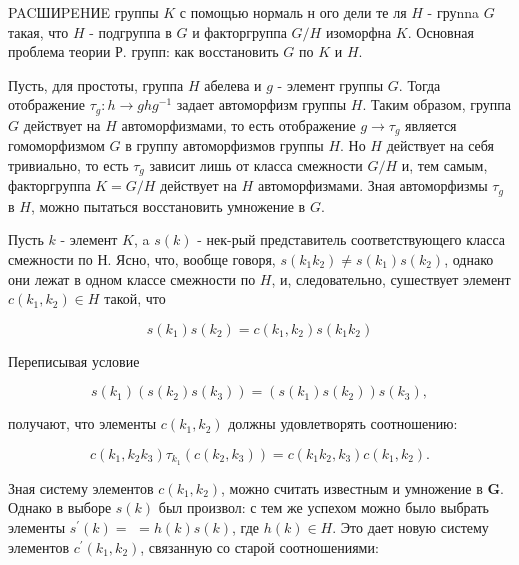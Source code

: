 \documentclass[10pt]{article}
\begin{document}
PACШИPEHИE группы $K$ с помощью нормаль н ого дели те ля $H$ - груnna $G$ такая, что $H$ - подгруппа в $G$ и факторгруппа $G / H$ изоморфна $K$. Основная проблема теории Р. групп: как восстановить $G$ по $K$ и $H$.



Пусть, для простоты, группа $H$ абелева и $g$ - элемент группы $G$. Тогда отображение $\tau_{g}: h \rightarrow g h g^{-1}$ задает автоморфизм группы $H$. Таким образом, группа $G$ действует на $H$ автоморфизмами, то есть отображение $g \rightarrow \tau_{g}$ является гомоморфизмом $G$ в группу автоморфизмов группы $H$. Но $H$ действует на себя тривиально, то есть $\tau_{g}$ зависит лишь от класса смежности $G / H$ и, тем самым, факторгруппа $K=G / H$ действует на $H$ автоморфизмами. Зная автоморфизмы $\tau_{g}$ в $H$, можно пытаться восстановить умножение в $G$.



Пусть $k$ - элемент $K$, a $s(k)$ - нек-рый представитель соответствующего класса смежности по Н. Ясно, что, вообще говоря, $s\left(k_{1} k_{2}\right) \neq s\left(k_{1}\right) s\left(k_{2}\right)$, однако они лежат в одном классе смежности по $H$, и, следовательно, сушествует элемент $c\left(k_{1}, k_{2}\right) \in H$ такой, что



\[

s\left(k_{1}\right) s\left(k_{2}\right)=c\left(k_{1}, k_{2}\right) s\left(k_{1} k_{2}\right)

\]



Переписывая условие



\[

s\left(k_{1}\right)\left(s\left(k_{2}\right) s\left(k_{3}\right)\right)=\left(s\left(k_{1}\right) s\left(k_{2}\right)\right) s\left(k_{3}\right),

\]



получают, что элементы $c\left(k_{1}, k_{2}\right)$ должны удовлетворять соотношению:



\[

c\left(k_{1}, k_{2} k_{3}\right) \tau_{k_{1}}\left(c\left(k_{2}, k_{3}\right)\right)=c\left(k_{1} k_{2}, k_{3}\right) c\left(k_{1}, k_{2}\right) .

\]



Зная систему элементов $c\left(k_{1}, k_{2}\right)$, можно считать известным и умножение в $\boldsymbol{G}$. Однако в выборе $s(k)$ был произвол: с тем же успехом можно было выбрать элементы $s^{\prime}(k)=$ $=h(k) s(k)$, где $h(k) \in H$. Это дает новую систему элементов $c^{\prime}\left(k_{1}, k_{2}\right)$, связанную со старой соотношениями:
\end{document}
